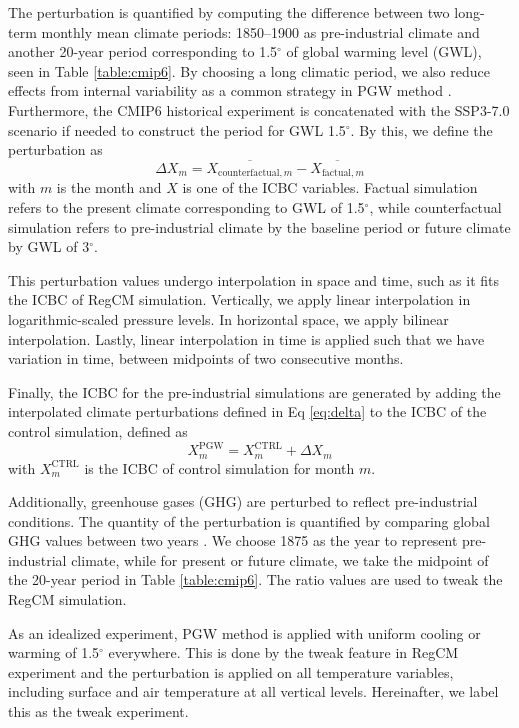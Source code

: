 The perturbation is quantified by computing the difference between two long-term monthly mean climate periods: 1850--1900 as pre-industrial climate and another 20-year period corresponding to 1.5$^\circ$ of global warming level (GWL), seen in Table \ref{table:cmip6}. By choosing a long climatic period, we also reduce effects from internal variability as a common strategy in PGW method \citep{brogli2023pseudo}. Furthermore, the CMIP6 historical experiment is concatenated with the SSP3-7.0 scenario if needed to construct the period for GWL 1.5$^\circ$. By this, we define the perturbation as
\begin{equation} \label{eq:delta}
    \Delta X_m = \overline{X_{\text{counterfactual}, m}} - \overline{X_{\text{factual}, m}}
\end{equation}
with $m$ is the month and $X$ is one of the ICBC variables. Factual simulation refers to the present climate corresponding to GWL of 1.5$^\circ$, while counterfactual simulation refers to pre-industrial climate by the baseline period or future climate by GWL of 3$^\circ$.

This perturbation values undergo interpolation in space and time, such as it fits the ICBC of RegCM simulation. Vertically, we apply linear interpolation in logarithmic-scaled pressure levels. In horizontal space, we apply bilinear interpolation. Lastly, linear interpolation in time is applied such that we have variation in time, between midpoints of two consecutive months.

Finally, the ICBC for the pre-industrial simulations are generated by adding the interpolated climate perturbations defined in Eq \eqref{eq:delta} to the ICBC of the control simulation, defined as
\begin{equation}
    X^{\text{PGW}}_m = X^{\text{CTRL}}_m + \Delta X_m
\end{equation}
with $X^{\text{CTRL}}_m$ is the ICBC of control simulation for month $m$.

Additionally, greenhouse gases (GHG) are perturbed to reflect pre-industrial conditions. The quantity of the perturbation is quantified by comparing global GHG values between two years \citep{meinshausen2017historical, meinshausen2020ssp}. We choose 1875 as the year to represent pre-industrial climate, while for present or future climate, we take the midpoint of the 20-year period in Table \ref{table:cmip6}. The ratio values are used to tweak the RegCM simulation.

As an idealized experiment, PGW method is applied with uniform cooling or warming of 1.5$^\circ$ everywhere. This is done by the tweak feature in RegCM experiment and the perturbation is applied on all temperature variables, including surface and air temperature at all vertical levels. Hereinafter, we label this as the tweak experiment.

